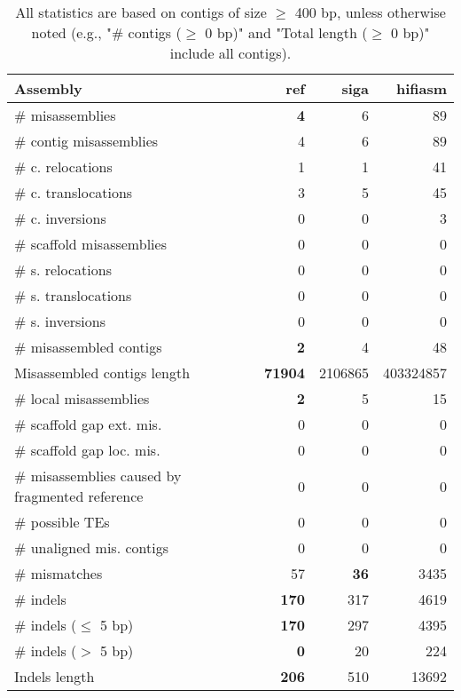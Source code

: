 \documentclass[12pt,a4paper]{article}
\begin{document}
\begin{table}[ht]
\begin{center}
\caption{All statistics are based on contigs of size $\geq$ 400 bp, unless otherwise noted (e.g., "\# contigs ($\geq$ 0 bp)" and "Total length ($\geq$ 0 bp)" include all contigs).}
\begin{tabular}{|l*{3}{|r}|}
\hline
Assembly & ref & siga & hifiasm \\ \hline
\# misassemblies & {\bf 4} & 6 & 89 \\ \hline
\hspace{2mm}\# contig misassemblies & 4 & 6 & 89 \\ \hline
\hspace{5mm}\# c. relocations & 1 & 1 & 41 \\ \hline
\hspace{5mm}\# c. translocations & 3 & 5 & 45 \\ \hline
\hspace{5mm}\# c. inversions & 0 & 0 & 3 \\ \hline
\hspace{2mm}\# scaffold misassemblies & 0 & 0 & 0 \\ \hline
\hspace{5mm}\# s. relocations & 0 & 0 & 0 \\ \hline
\hspace{5mm}\# s. translocations & 0 & 0 & 0 \\ \hline
\hspace{5mm}\# s. inversions & 0 & 0 & 0 \\ \hline
\# misassembled contigs & {\bf 2} & 4 & 48 \\ \hline
Misassembled contigs length & {\bf 71904} & 2106865 & 403324857 \\ \hline
\# local misassemblies & {\bf 2} & 5 & 15 \\ \hline
\# scaffold gap ext. mis. & 0 & 0 & 0 \\ \hline
\# scaffold gap loc. mis. & 0 & 0 & 0 \\ \hline
\# misassemblies caused by fragmented reference & 0 & 0 & 0 \\ \hline
\# possible TEs & 0 & 0 & 0 \\ \hline
\# unaligned mis. contigs & 0 & 0 & 0 \\ \hline
\# mismatches & 57 & {\bf 36} & 3435 \\ \hline
\# indels & {\bf 170} & 317 & 4619 \\ \hline
\hspace{5mm}\# indels ($\leq$ 5 bp) & {\bf 170} & 297 & 4395 \\ \hline
\hspace{5mm}\# indels ($>$ 5 bp) & {\bf 0} & 20 & 224 \\ \hline
Indels length & {\bf 206} & 510 & 13692 \\ \hline
\end{tabular}
\end{center}
\end{table}
\end{document}
